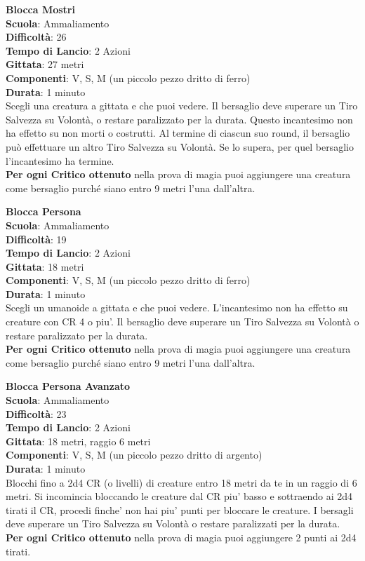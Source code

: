 \begin{multicols}{2}
\medskip\textbf{Blocca Mostri}\\
\textbf{Scuola}: Ammaliamento\\
\textbf{Difficoltà}: 26\\
\textbf{Tempo di Lancio}: 2 Azioni\\
\textbf{Gittata}: 27 metri\\
\textbf{Componenti}: V, S, M (un piccolo pezzo dritto di ferro)\\
\textbf{Durata}: 1 minuto\\
Scegli una creatura a gittata e che puoi vedere. Il bersaglio deve superare un Tiro Salvezza su Volontà, o restare paralizzato per la durata. Questo incantesimo non ha effetto su non morti o costrutti. Al termine di ciascun suo round, il bersaglio può effettuare un altro Tiro Salvezza su Volontà. Se lo supera, per quel bersaglio l'incantesimo ha termine.\\
\textbf{Per ogni Critico ottenuto} nella prova di magia puoi aggiungere una creatura come bersaglio purché siano entro 9 metri l'una dall'altra.

\medskip\textbf{Blocca Persona}\\
\textbf{Scuola}: Ammaliamento\\
\textbf{Difficoltà}: 19\\
\textbf{Tempo di Lancio}: 2 Azioni\\
\textbf{Gittata}: 18 metri\\
\textbf{Componenti}: V, S, M (un piccolo pezzo dritto di ferro)\\
\textbf{Durata}: 1 minuto\\
Scegli un umanoide a gittata e che puoi vedere. L'incantesimo non ha effetto su creature con CR 4 o piu'. Il bersaglio deve superare un Tiro Salvezza su Volontà o restare paralizzato per la durata.\\
\textbf{Per ogni Critico ottenuto} nella prova di magia puoi aggiungere una creatura come bersaglio purché siano entro 9 metri l'una dall'altra.

\medskip\textbf{Blocca Persona Avanzato}\\
\textbf{Scuola}: Ammaliamento\\
\textbf{Difficoltà}: 23\\
\textbf{Tempo di Lancio}: 2 Azioni\\
\textbf{Gittata}: 18 metri, raggio 6 metri\\
\textbf{Componenti}: V, S, M (un piccolo pezzo dritto di argento)\\
\textbf{Durata}: 1 minuto\\
Blocchi fino a 2d4 CR (o livelli) di creature entro 18 metri da te in un raggio di 6 metri. Si incomincia bloccando le creature dal CR piu' basso e sottraendo ai 2d4 tirati il CR, procedi finche' non hai piu' punti per bloccare le creature. I bersagli deve superare un Tiro Salvezza su Volontà o restare paralizzati per la durata.\\
\textbf{Per ogni Critico ottenuto} nella prova di magia puoi aggiungere 2 punti ai 2d4 tirati.


\end{multicols}

